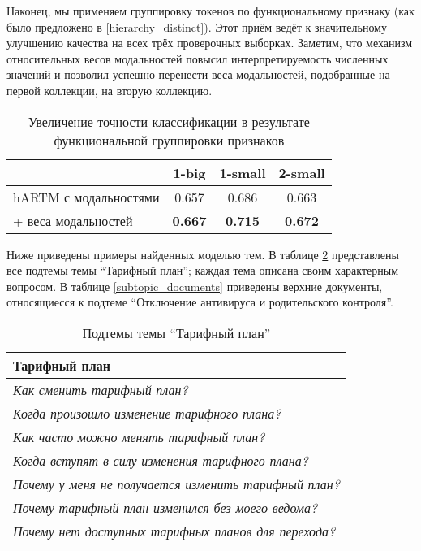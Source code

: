 Наконец, мы применяем группировку токенов по функциональному признаку (как было предложено в \ref{hierarchy_distinct}). Этот приём ведёт к значительному улучшению качества на всех трёх проверочных выборках. Заметим, что механизм относительных весов модальностей повысил интерпретируемость численных значений и позволил успешно перенести веса модальностей, подобранные на первой коллекции, на вторую коллекцию.

\begin{table}[!h] 
    \centering 
\begin{tabular}{p{3.7cm}|c|c|c}
    \hline
    & 1-big            & 1-small            & 2-small            \\ \hline
    hARTM с модальностями         & 0.657          & 0.686          & 0.663          \\
    + веса модальностей & \textbf{0.667} & \textbf{0.715} & \textbf{0.672} \\ \hline
\end{tabular}
    \caption{Увеличение точности классификации в результате функциональной группировки признаков}
    \label{results}
\end{table}

Ниже приведены примеры найденных моделью тем. В таблице \ref{topic_subtopic} представлены все подтемы темы ``Тарифный план''; каждая тема описана своим характерным вопросом. В таблице \ref{subtopic_documents} приведены верхние документы, относящиесся к подтеме ``Отключение антивируса и родительского контроля''.

\begin{table}[!h]
\begin{tabular}{p{7cm}}
  \hline
  \textbf{Тарифный план} \\
  \hline
  \textsl{Как сменить тарифный план?} \\
  \textsl{Когда произошло изменение тарифного плана?} \\
  \textsl{Как часто можно менять тарифный план?} \\
  \textsl{Когда вступят в силу изменения тарифного плана?} \\
  \textsl{Почему у меня не получается изменить тарифный план?} \\
  \textsl{Почему тарифный план изменился без моего ведома?} \\
  \textsl{Почему нет доступных тарифных планов для перехода?} \\
  \hline
\end{tabular}
\caption{Подтемы темы ``Тарифный план''}
\label{topic_subtopic}
\end{table}

